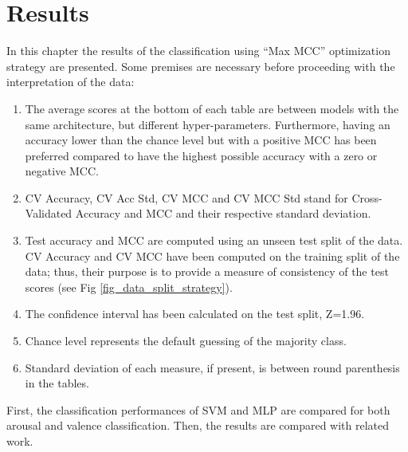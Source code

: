 \chapter{Results}
\label{chap:results}
In this chapter the results of the classification using “Max MCC” optimization strategy are presented. Some premises are necessary before proceeding with the interpretation of the data:
\begin{enumerate}
\item 	The average scores at the bottom of each table are between models with the same architecture, but different hyper-parameters. Furthermore, having an accuracy lower than the chance level but with a positive \ac{MCC} has been preferred compared to have the highest possible accuracy with a zero or negative \ac{MCC}.
\item 	CV Accuracy, CV Acc Std, \ac{CV MCC} and CV MCC Std stand for Cross-Validated Accuracy and MCC and their respective standard deviation.
\item 	Test accuracy and \ac{MCC} are computed using an unseen test split of the data. CV Accuracy and \ac{CV MCC} have been computed on the training split of the data; thus, their purpose is to provide a measure of consistency of the test scores (see Fig \ref{fig_data_split_strategy}).
\item 	The confidence interval has been calculated on the test split, Z=1.96. 
\item 	Chance level represents the default guessing of the majority class.
\item 	Standard deviation of each measure, if present, is between round parenthesis in the tables.
\end{enumerate}

First, the classification performances of \ac{SVM} and \ac{MLP} are compared for both arousal and valence classification. Then, the results are compared with related work.

